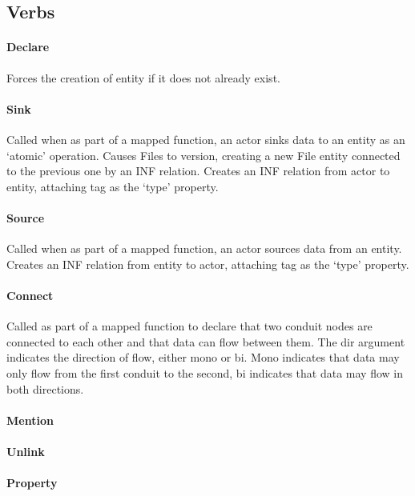 \documentclass[12pt,twoside,openright,a4paper]{article}
\begin{document}
\subsection{Verbs}

\paragraph{Declare}
Forces the creation of entity if it does not already exist.

\paragraph{Sink}
Called when as part of a mapped function, an actor sinks data to an entity as an ‘atomic’ operation.
Causes Files to version, creating a new File entity connected to the previous one by an INF relation.
Creates an INF relation from actor to entity, attaching tag as the ‘type’ property. 

\paragraph{Source}
Called when as part of a mapped function, an actor sources data from an entity.
Creates an INF relation from entity to actor, attaching tag as the ‘type’ property.

\paragraph{Connect}
Called as part of a mapped function to declare that two conduit nodes are connected to each other and that data can flow between them. The dir argument indicates the direction of flow, either mono or bi. Mono indicates that data may only flow from the first conduit to the second, bi indicates that data may flow in both directions. 

\paragraph{Mention}

\paragraph{Unlink}

\paragraph{Property}
\end{document}
